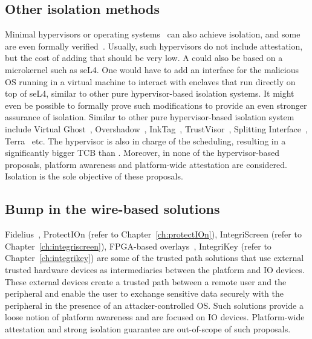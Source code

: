 \subsection{Other isolation methods} 

Minimal hypervisors or operating systems~\cite{herder2006minix,klein2009sel4} can also achieve isolation, and some are even formally verified~\cite{klein2009sel4}. Usually, such hypervisors do not include attestation, but the cost of adding that should be very low. A \name{} could also be based on a microkernel such as seL4. One would have to add an interface for the malicious OS running in a virtual machine to interact with enclaves that run directly on top of seL4, similar to other pure hypervisor-based isolation systems. It might even be possible to formally prove such modifications to provide an even stronger assurance of isolation. Similar to other pure hypervisor-based isolation system include Virtual Ghost~\cite{criswell2014virtual}, Overshadow~\cite{Overshadow}, InkTag~\cite{hofmann2013inktag}, TrustVisor~\cite{mccune2010trustvisor}, Splitting Interface~\cite{ta2006splitting}, Terra~\cite{garfinkel2003terra} etc.  The hypervisor is also in charge of the scheduling, resulting in a significantly bigger TCB than \name. Moreover, in none of the hypervisor-based proposals, platform awareness and platform-wide attestation are considered. Isolation is the sole objective of these proposals.

\subsection{Bump in the wire-based solutions} 

Fidelius~\cite{Fidelius}, ProtectIOn (refer to Chapter~\ref{ch:protectIOn}), IntegriScreen (refer to Chapter~\ref{ch:integriscreen}), FPGA-based overlays~\cite{brandon2017trusted}, IntegriKey (refer to Chapter~\ref{ch:integrikey}) are some of the trusted path solutions that use external trusted hardware devices as intermediaries between the platform and IO devices. These external devices create a trusted path between a remote user and the peripheral and enable the user to exchange sensitive data securely with the peripheral in the presence of an attacker-controlled OS. Such solutions provide a loose notion of platform awareness and are focused on IO devices. Platform-wide attestation and strong isolation guarantee are out-of-scope of such proposals. 



%     

